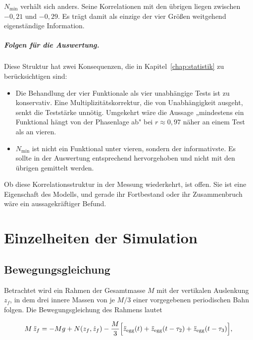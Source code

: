 \documentclass[12pt,a4paper]{report}
\begin{document}
$N_{\min}$ verhält sich anders. Seine Korrelationen mit den übrigen
liegen zwischen $-0{,}21$ und $-0{,}29$. Es trägt damit als einzige der
vier Größen weitgehend eigenständige Information.

\paragraph{Folgen für die Auswertung.}
Diese Struktur hat zwei Konsequenzen, die in
Kapitel~\ref{chap:statistik} zu berücksichtigen sind:

\begin{itemize}
\item Die Behandlung der vier Funktionale als vier unabhängige Tests ist
      zu konservativ. Eine Multiplizitätskorrektur, die von
      Unabhängigkeit ausgeht, senkt die Teststärke unnötig. Umgekehrt
      wäre die Aussage „mindestens ein Funktional hängt von der
      Phasenlage ab" bei $r \approx 0{,}97$ näher an einem Test als an
      vieren.
\item $N_{\min}$ ist nicht ein Funktional unter vieren, sondern der
      informativste. Es sollte in der Auswertung entsprechend
      hervorgehoben und nicht mit den übrigen gemittelt werden.
\end{itemize}

Ob diese Korrelationsstruktur in der Messung wiederkehrt, ist offen. Sie
ist eine Eigenschaft des Modells, und gerade ihr Fortbestand oder ihr
Zusammenbruch wäre ein aussagekräftiger Befund.


\chapter{Einzelheiten der Simulation}
\label{app:simulation}

\section{Bewegungsgleichung}

Betrachtet wird ein Rahmen der Gesamtmasse $M$ mit der vertikalen
Auslenkung $z_f$, in dem drei innere Massen von je $M/3$ einer
vorgegebenen periodischen Bahn folgen. Die Bewegungsgleichung des
Rahmens lautet

\begin{equation}
M\,\ddot{z}_f = -M g + N(z_f, \dot{z}_f)
- \frac{M}{3}\Bigl[\ddot{z}_{\mathrm{egg}}(t)
+ \ddot{z}_{\mathrm{egg}}(t-\tau_2)
+ \ddot{z}_{\mathrm{egg}}(t-\tau_3)\Bigr],
\label{eq:bewegung}
\end{equation}
\end{document}
